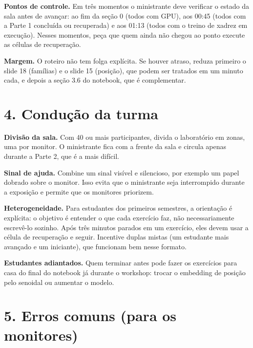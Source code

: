 \documentclass[
  11pt,
]{article}
\begin{document}
\textbf{Pontos de controle.} Em três momentos o ministrante deve
verificar o estado da sala antes de avançar: ao fim da seção 0 (todos
com GPU), aos 00:45 (todos com a Parte 1 concluída ou recuperada) e aos
01:13 (todos com o treino de xadrez em execução). Nesses momentos, peça
que quem ainda não chegou ao ponto execute as células de recuperação.

\textbf{Margem.} O roteiro não tem folga explícita. Se houver atraso,
reduza primeiro o slide 18 (famílias) e o slide 15 (posição), que podem
ser tratados em um minuto cada, e depois a seção 3.6 do notebook, que é
complementar.

\section{4. Condução da turma}\label{conduuxe7uxe3o-da-turma}

\textbf{Divisão da sala.} Com 40 ou mais participantes, divida o
laboratório em zonas, uma por monitor. O ministrante fica com a frente
da sala e circula apenas durante a Parte 2, que é a mais difícil.

\textbf{Sinal de ajuda.} Combine um sinal visível e silencioso, por
exemplo um papel dobrado sobre o monitor. Isso evita que o ministrante
seja interrompido durante a exposição e permite que os monitores
priorizem.

\textbf{Heterogeneidade.} Para estudantes dos primeiros semestres, a
orientação é explícita: o objetivo é entender o que cada exercício faz,
não necessariamente escrevê-lo sozinho. Após três minutos parados em um
exercício, eles devem usar a célula de recuperação e seguir. Incentive
duplas mistas (um estudante mais avançado e um iniciante), que funcionam
bem nesse formato.

\textbf{Estudantes adiantados.} Quem terminar antes pode fazer os
exercícios para casa do final do notebook já durante o workshop: trocar
o embedding de posição pelo senoidal ou aumentar o modelo.

\section{5. Erros comuns (para os
monitores)}\label{erros-comuns-para-os-monitores}
\end{document}
